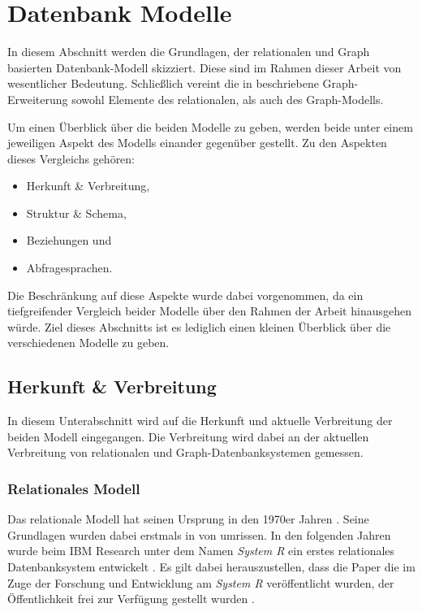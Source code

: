 \section{Datenbank Modelle}
In diesem Abschnitt werden die Grundlagen, der relationalen und Graph basierten Datenbank-Modell skizziert. Diese sind im Rahmen dieser Arbeit von wesentlicher Bedeutung. Schließlich vereint die in  beschriebene Graph-Erweiterung sowohl Elemente des relationalen, als auch des Graph-Modells.

Um einen Überblick über die beiden Modelle zu geben, werden beide unter einem jeweiligen Aspekt des Modells einander gegenüber gestellt. Zu den Aspekten dieses Vergleichs gehören: 

\begin{itemize}
    \item Herkunft \& Verbreitung,
    \item Struktur \& Schema,
    \item Beziehungen und
    \item Abfragesprachen.
\end{itemize}

Die Beschränkung auf diese Aspekte wurde dabei vorgenommen, da ein tiefgreifender Vergleich beider Modelle über den Rahmen der Arbeit hinausgehen würde. Ziel dieses Abschnitts ist es lediglich einen kleinen Überblick über die verschiedenen Modelle zu geben. 

\subsection{Herkunft \& Verbreitung}
In diesem Unterabschnitt wird auf die Herkunft und aktuelle Verbreitung der beiden Modell eingegangen. Die Verbreitung wird dabei an der aktuellen Verbreitung von relationalen und Graph-Datenbanksystemen gemessen. 

\subsubsection{Relationales Modell}
Das relationale Modell hat seinen Ursprung in den 1970er Jahren \cite{rdbms_history}. Seine Grundlagen wurden dabei erstmals in \cite{codd_relational_model} von \citeauthor{codd_relational_model} umrissen. In den folgenden Jahren  wurde beim IBM Research unter dem Namen \textit{System R} ein erstes relationales Datenbanksystem entwickelt \cite{rdbms_history}. Es gilt dabei herauszustellen, dass die Paper die im Zuge der Forschung und Entwicklung am \textit{System R} veröffentlicht wurden, der Öffentlichkeit frei zur Verfügung gestellt wurden \cite{rdbms_history}. 

